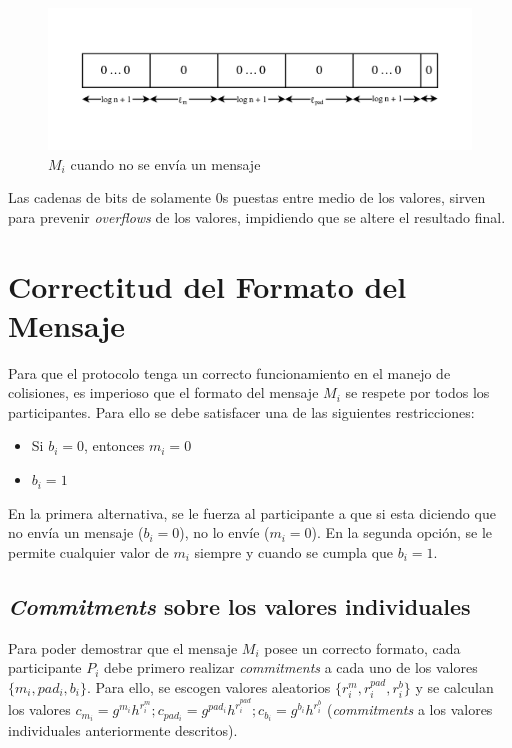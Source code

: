 \begin{figure}[H]
  \centering
    \includegraphics[width=1\textwidth]{imagenes/message-format-nomessage.pdf}
  \caption{$M_i$ cuando no se envía un mensaje}
  \label{fig:M_not_sending}
\end{figure}

Las cadenas de bits de solamente 0s puestas entre medio de los valores, sirven para 
prevenir \emph{overflows} de los valores, impidiendo que se altere el resultado 
final.

\section{Correctitud del Formato del Mensaje}

Para que el protocolo tenga un correcto funcionamiento en el manejo de colisiones, 
es imperioso que el formato del mensaje $M_i$ se respete por todos los participantes. 
Para ello se debe satisfacer una de las siguientes restricciones:
\begin{itemize}
    \item Si $b_i = 0$, entonces $m_i = 0$
    \item $b_i = 1$
\end{itemize}

En la primera alternativa, se le fuerza al participante a que si esta diciendo que 
no envía un mensaje ($b_i = 0$), no lo envíe ($m_i = 0$). En la segunda opción, se 
le permite cualquier valor de $m_i$ siempre y cuando se cumpla que $b_i = 1$.

\subsection{\emph{Commitments} sobre los valores individuales}

Para poder demostrar que el mensaje $M_i$ posee un correcto formato, cada participante $P_i$  
debe primero realizar \emph{commitments} a cada uno de los valores $\{m_i, pad_i, b_i\}$. 
Para ello, se escogen valores aleatorios $\{r_i^m, r_i^{pad}, r_i^b\}$ y se calculan 
los valores $c_{m_i} = g^{m_i} h^{r_i^m}; c_{pad_i} = g^{pad_i} h^{r_i^{pad}}; c_{b_i} = g^{b_i} h^{r_i^b}$ 
(\emph{commitments} a los valores individuales anteriormente descritos).


